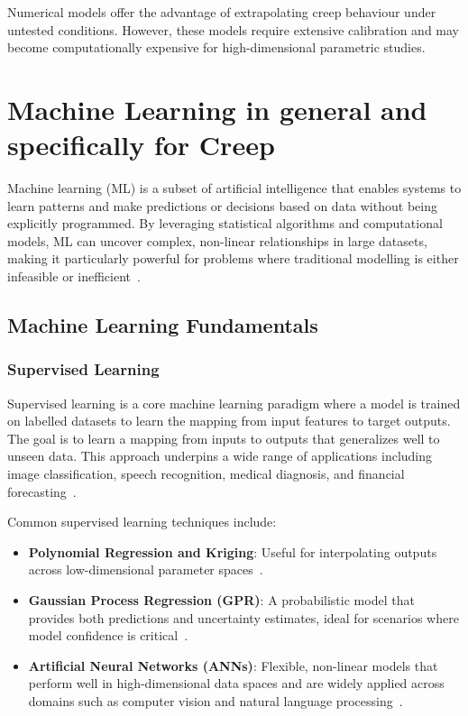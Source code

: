 \documentclass[class=scrbook, crop=false]{standalone}
\begin{document}
Numerical models offer the advantage of extrapolating creep behaviour under untested conditions. However, these models require extensive calibration and may become computationally expensive for high-dimensional parametric studies.

\section{Machine Learning in general and specifically for Creep}
\label{Section::Machine_learning}

Machine learning (ML) is a subset of artificial intelligence that enables systems to learn patterns and make predictions or decisions based on data without being explicitly programmed. By leveraging statistical algorithms and computational models, ML can uncover complex, non-linear relationships in large datasets, making it particularly powerful for problems where traditional modelling is either infeasible or inefficient~\cite{bishop2006pattern}.

\subsection{Machine Learning Fundamentals}

\subsubsection{Supervised Learning}

Supervised learning is a core machine learning paradigm where a model is trained on labelled datasets to learn the mapping from input features to target outputs. The goal is to learn a mapping from inputs to outputs that generalizes well to unseen data. This approach underpins a wide range of applications including image classification, speech recognition, medical diagnosis, and financial forecasting~\cite{bishop2006pattern}.

Common supervised learning techniques include:

\begin{itemize}
	\item \textbf{Polynomial Regression and Kriging}: Useful for interpolating outputs across low-dimensional parameter spaces~\cite{kleijnen2009kriging}.
	\item \textbf{Gaussian Process Regression (GPR)}: A probabilistic model that provides both predictions and uncertainty estimates, ideal for scenarios where model confidence is critical~\cite{rasmussen2006gaussian}.
	\item \textbf{Artificial Neural Networks (ANNs)}: Flexible, non-linear models that perform well in high-dimensional data spaces and are widely applied across domains such as computer vision and natural language processing~\cite{bishop2006pattern}.
\end{itemize}
\end{document}
